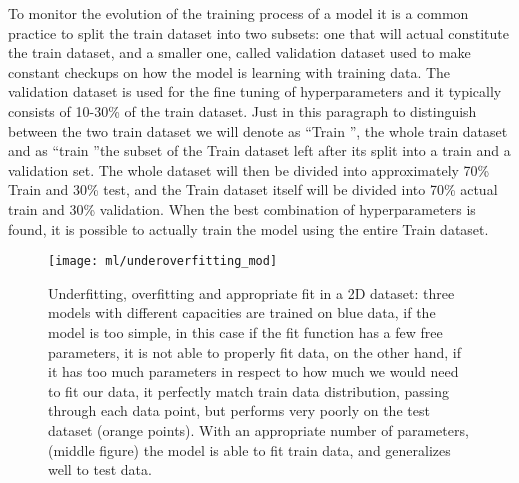 \documentclass[11pt]{report}
\begin{document}
To monitor the evolution of the training process of a model it is a common practice to split the train dataset into two subsets: one that will actual constitute the train dataset, and a smaller one, called validation dataset used to make constant checkups on how the model is learning with training data.
The validation dataset is used for the fine tuning of hyperparameters and it typically consists of 10-30\% of the train dataset.
Just in this paragraph to distinguish between the two train dataset we will denote as \textquotedblleft Train \textquotedblright, the whole train dataset and as \textquotedblleft train \textquotedblright the subset of the Train dataset left after its split into a train and a validation set.
The whole dataset will then be divided into approximately 70\% Train and 30\% test, and the Train dataset itself will be divided into 70\% actual train and 30\% validation.
When the best combination of hyperparameters is found, it is possible to actually train the model using the entire Train dataset.


\begin{figure}
\centering
\texttt{[image: ml/underoverfitting\_mod]}
\caption{Underfitting, overfitting and appropriate fit in a 2D dataset: three models with different capacities are trained on blue data, if the model is too simple, in this case if the fit function has a few free parameters, it is not able to properly fit data, on the other hand, if it has too much parameters in respect to how much we would need to fit our data, it perfectly match train data distribution, passing through each data point, but performs very poorly on the test dataset (orange points). With an appropriate number of parameters, (middle figure) the model is able to fit train data, and generalizes well to test data.
}
\label{fig:underoverfitting}
% 
\end{figure}
\end{document}
